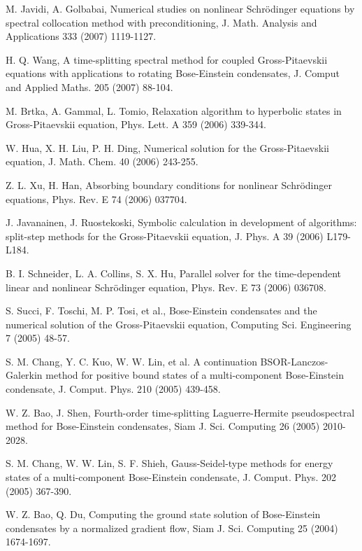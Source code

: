 \documentclass[onecolumn]{elsart3p}
\begin{document}
\begin{thebibliography}{99}
M. Javidi, A. Golbabai, Numerical studies on nonlinear Schr\"odinger
equations by spectral collocation method with preconditioning, J.
Math. Analysis and Applications  333 (2007) 1119-1127.

H. Q. Wang, A time-splitting spectral method for coupled
Gross-Pitaevskii equations with applications to rotating Bose-Einstein
condensates, J.  Comput and Applied Maths. 205 (2007) 88-104.

M. Brtka, A. Gammal, L. Tomio, Relaxation algorithm to hyperbolic
states in Gross-Pitaevskii equation, Phys. Lett. A 359 (2006) 339-344.


W. Hua, X. H. Liu, P. H. Ding, Numerical solution for the
Gross-Pitaevskii equation, J. Math. Chem. 40 (2006) 243-255.

Z. L. Xu, H.  Han, Absorbing boundary conditions for nonlinear
Schr\"odinger equations, Phys. Rev. E 74 (2006)  037704.


J. Javanainen, J. Ruostekoski, Symbolic calculation in development of
algorithms: split-step methods for the Gross-Pitaevskii equation, J.
Phys. A 39 (2006) L179-L184.

B. I. Schneider, L. A. Collins, S. X. Hu, Parallel solver for the
time-dependent linear and nonlinear Schr\"odinger equation, Phys. Rev.
E  73 (2006) 036708.

S.  Succi, F. Toschi, M. P. Tosi, et al., Bose-Einstein condensates
and the numerical solution of the Gross-Pitaevskii equation, Computing
Sci. Engineering 7 (2005) 48-57.

S. M. Chang, Y. C. Kuo, W. W. Lin, et al. A continuation
BSOR-Lanczos-Galerkin method for positive bound states of a
multi-component Bose-Einstein condensate, J. Comput. Phys. 210 (2005)
439-458.

W. Z. Bao, J. Shen, Fourth-order time-splitting Laguerre-Hermite
pseudospectral method for Bose-Einstein condensates,
Siam J.  Sci.
Computing 26 (2005) 2010-2028.

S. M. Chang, W. W. Lin, S. F. Shieh, Gauss-Seidel-type methods for
energy states of a multi-component Bose-Einstein condensate, J.
Comput.  Phys.  202 (2005) 367-390.

W. Z.  Bao, Q. Du, Computing the ground state solution of
Bose-Einstein condensates by a normalized gradient flow, Siam J.
Sci.  Computing 25 (2004) 1674-1697.


\end{thebibliography}
\end{document}
